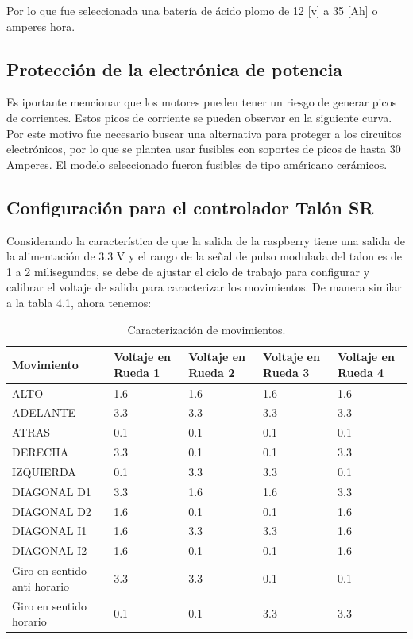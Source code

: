 \documentclass[12pt]{book} %
\begin{document}
Por lo que fue seleccionada una batería de ácido plomo de 12 [v] a 35 [Ah] o amperes hora.


	\subsection{Protección de la electrónica de potencia}
	Es iportante mencionar que los motores pueden tener un riesgo de generar picos de corrientes. Estos picos de corriente se pueden observar en la siguiente curva.\\
	Por este motivo fue necesario buscar una alternativa para proteger a los circuitos electrónicos, por lo que se plantea usar fusibles con soportes de picos de hasta 30 Amperes. El modelo seleccionado fueron fusibles de tipo américano cerámicos.	
		
		
\subsection{Configuración para el controlador Talón SR}
		
Considerando la característica de que la salida de la raspberry tiene una salida de la alimentación de 3.3 V y el rango de la señal de pulso modulada del talon es de 1 a 2 milisegundos, se debe de ajustar el ciclo de trabajo para configurar y calibrar el voltaje de salida para caracterizar los movimientos. De manera similar a la tabla 4.1, ahora tenemos:\\
\begin{table}[t]
\begin{center}
\begin{tabular}{| p{4cm} | p{3cm} | p{3cm} | p{3cm}  | p{3cm} |} 
	
	\hline
	Movimiento & Voltaje en Rueda 1 & Voltaje en Rueda 2 & Voltaje en Rueda 3 & Voltaje en Rueda 4\\
	\hline
	ALTO & 1.6 & 1.6 & 1.6 & 1.6\\
	\hline
	ADELANTE & 3.3 & 3.3 & 3.3 & 3.3\\
	\hline
	ATRAS & 0.1 & 0.1 & 0.1 & 0.1\\
	\hline
	DERECHA & 3.3 & 0.1 & 0.1 & 3.3\\
	\hline
	IZQUIERDA & 0.1 & 3.3 & 3.3 & 0.1\\
	\hline
	DIAGONAL D1 & 3.3 & 1.6 & 1.6 & 3.3\\
	\hline
	DIAGONAL D2 & 1.6 & 0.1 & 0.1 & 1.6\\
	\hline
	DIAGONAL I1 & 1.6 & 3.3 & 3.3 & 1.6\\
	\hline
	DIAGONAL I2 & 1.6 & 0.1 & 0.1 & 1.6\\
	\hline
Giro en sentido anti horario & 3.3 &3.3 & 0.1 & 0.1\\
	\hline
Giro en sentido horario & 0.1 & 0.1 & 3.3 & 3.3\\
	\hline
\end{tabular}
\caption{Caracterización de movimientos.}
\end{center}
\end{table}
\end{document}
